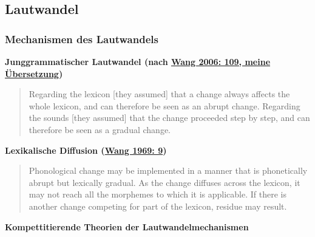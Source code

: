 \subsection{\texorpdfstring{{Lautwandel}}{Lautwandel}}

\subsubsection{\texorpdfstring{{Mechanismen des
Lautwandels}}{Mechanismen des Lautwandels}}

\par\noindent\textbf{Junggrammatischer Lautwandel (nach
\href{http://bibliography.lingpy.org?key=Wang2006a}{Wang 2006: 109,
meine Übersetzung})}

\begin{quote}
Regarding the lexicon {[}they assumed{]} that a change always affects
the whole lexicon, and can therefore be seen as an abrupt change.
Regarding the sounds {[}they assumed{]} that the change proceeded step
by step, and can therefore be seen as a gradual change.
\end{quote}


\par\noindent\textbf{Lexikalische Diffusion
(\href{http://bibliography.lingpy.org?key=Wang1969}{Wang 1969: 9})}

\begin{quote}
Phonological change may be implemented in a manner that is phonetically
abrupt but lexically gradual. As the change diffuses across the lexicon,
it may not reach all the morphemes to which it is applicable. If there
is another change competing for part of the lexicon, residue may result.
\end{quote}

\par\noindent\textbf{Kompettitierende Theorien der Lautwandelmechanismen}

